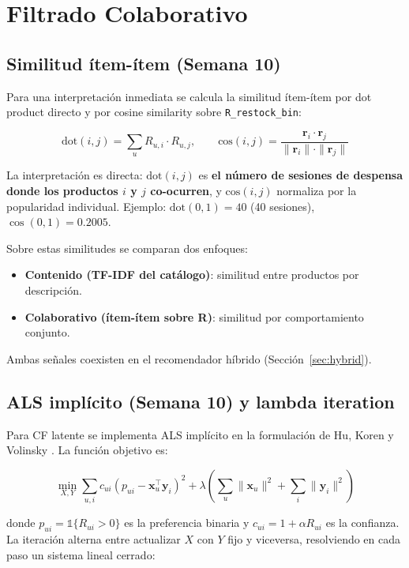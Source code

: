 \documentclass[12pt,a4paper]{article}
\newcommand{\code}[1]{\texttt{\small #1}}
\begin{document}
\section{Filtrado Colaborativo}

\subsection{Similitud ítem-ítem (Semana 10)}

Para una interpretación inmediata se calcula la similitud ítem-ítem por dot product directo y por cosine similarity sobre \code{R\_restock\_bin}:

\[
\text{dot}(i, j) = \sum_{u} R_{u,i} \cdot R_{u,j}, \qquad
\text{cos}(i, j) = \frac{\mathbf{r}_i \cdot \mathbf{r}_j}{\|\mathbf{r}_i\| \cdot \|\mathbf{r}_j\|}
\]

La interpretación es directa: $\text{dot}(i, j)$ es \textbf{el número de sesiones de despensa donde los productos $i$ y $j$ co-ocurren}, y $\text{cos}(i, j)$ normaliza por la popularidad individual. Ejemplo: $\text{dot}(0, 1) = 40$ (40 sesiones), $\cos(0, 1) = 0.2005$.

Sobre estas similitudes se comparan dos enfoques:
\begin{itemize}
    \item \textbf{Contenido (TF-IDF del catálogo)}: similitud entre productos por descripción.
    \item \textbf{Colaborativo (ítem-ítem sobre R)}: similitud por comportamiento conjunto.
\end{itemize}

Ambas señales coexisten en el recomendador híbrido (Sección~\ref{sec:hybrid}).

\subsection{ALS implícito (Semana 10) y lambda iteration}
\label{sec:als}

Para CF latente se implementa ALS implícito en la formulación de Hu, Koren y Volinsky \cite{hu2008collaborative}. La función objetivo es:

\begin{equation}
\min_{X, Y} \sum_{u, i} c_{ui} \left( p_{ui} - \mathbf{x}_u^\top \mathbf{y}_i \right)^2
+ \lambda \left( \sum_u \|\mathbf{x}_u\|^2 + \sum_i \|\mathbf{y}_i\|^2 \right)
\label{eq:als}
\end{equation}

donde $p_{ui} = \mathbb{1}\{R_{ui} > 0\}$ es la preferencia binaria y $c_{ui} = 1 + \alpha R_{ui}$ es la confianza. La iteración alterna entre actualizar $X$ con $Y$ fijo y viceversa, resolviendo en cada paso un sistema lineal cerrado:
\end{document}
